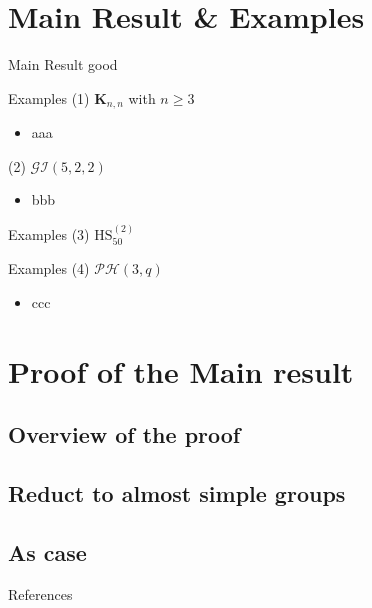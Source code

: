 \documentclass{beamer}
\begin{document}
\section{Main Result \& Examples}
\begin{frame}{Main Result}
good
\end{frame}

\begin{frame}{Examples}
(1) $\mathbf{K}_{n,n}$ with $n\geq 3$
\begin{itemize}
	\item aaa
\end{itemize}

(2) $\mathcal{GI}(5,2,2)$
\begin{itemize}
	\item bbb
\end{itemize}

\end{frame}

\begin{frame}{Examples}
(3) $\mathrm{HS}_{50}^{(2)}$

\end{frame}

\begin{frame}{Examples}
(4) $\mathcal{PH}(3,q)$
\begin{itemize}
	\item ccc
\end{itemize}
\end{frame}


\section{Proof of the Main result}
\subsection{Overview of the proof}
\subsection{Reduct to almost simple groups}
\subsection{As case}





\begin{frame}{References}
\small


\end{frame}
\end{document}
